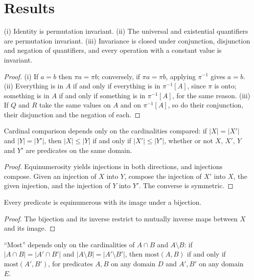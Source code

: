 \documentclass{situationist-preprint}
\begin{document}
\section{Results}\label{s:results}

\begin{proposition}\label{p:standard}
(i) Identity is permutation invariant. (ii) The universal and existential quantifiers are permutation invariant. (iii) Invariance is closed under conjunction, disjunction and negation of quantifiers, and every operation with a constant value is invariant.
\end{proposition}

\begin{proof}
(i) If $a = b$ then $\pi a = \pi b$; conversely, if $\pi a = \pi b$, applying $\pi^{-1}$ gives $a = b$. (ii) Everything is in $A$ if and only if everything is in $\pi^{-1}[A]$, since $\pi$ is onto; something is in $A$ if and only if something is in $\pi^{-1}[A]$, for the same reason. (iii) If $Q$ and $R$ take the same values on $A$ and on $\pi^{-1}[A]$, so do their conjunction, their disjunction and the negation of each.
\end{proof}

\begin{proposition}\label{p:transport}
Cardinal comparison depends only on the cardinalities compared: if $|X| = |X'|$ and $|Y| = |Y'|$, then $|X| \leq |Y|$ if and only if $|X'| \leq |Y'|$, whether or not $X$, $X'$, $Y$ and $Y'$ are predicates on the same domain.
\end{proposition}

\begin{proof}
Equinumerosity yields injections in both directions, and injections compose. Given an injection of $X$ into $Y$, compose the injection of $X'$ into $X$, the given injection, and the injection of $Y$ into $Y'$. The converse is symmetric.
\end{proof}

\begin{lemma}\label{l:image}
Every predicate is equinumerous with its image under a bijection.
\end{lemma}

\begin{proof}
The bijection and its inverse restrict to mutually inverse maps between $X$ and its image.
\end{proof}

\begin{theorem}\label{t:card}
\enquote{Most} depends only on the cardinalities of $A \cap B$ and $A \setminus B$: if $|A \cap B| = |A' \cap B'|$ and $|A \setminus B| = |A' \setminus B'|$, then $\mathrm{most}(A, B)$ if and only if $\mathrm{most}(A', B')$, for predicates $A, B$ on any domain $D$ and $A', B'$ on any domain $E$.
\end{theorem}
\end{document}

